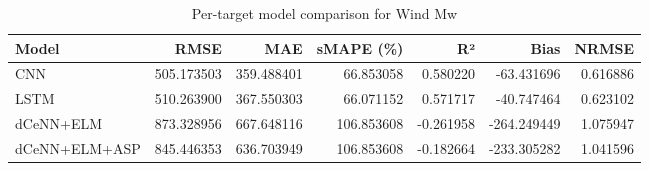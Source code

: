 \begin{table}
\caption{Per-target model comparison for Wind Mw}
\begin{tabular}{lrrrrrr}
\toprule
Model & RMSE & MAE & sMAPE (\%) & R² & Bias & NRMSE \\
\midrule
CNN & 505.173503 & 359.488401 & 66.853058 & 0.580220 & -63.431696 & 0.616886 \\
LSTM & 510.263900 & 367.550303 & 66.071152 & 0.571717 & -40.747464 & 0.623102 \\
dCeNN+ELM & 873.328956 & 667.648116 & 106.853608 & -0.261958 & -264.249449 & 1.075947 \\
dCeNN+ELM+ASP & 845.446353 & 636.703949 & 106.853608 & -0.182664 & -233.305282 & 1.041596 \\
\bottomrule
\end{tabular}
\end{table}
